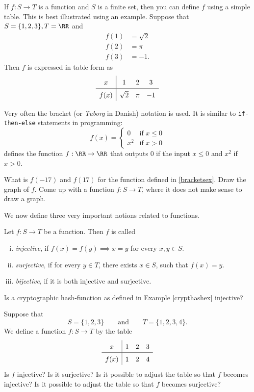 \documentclass{article}
\begin{document}
If $f: S\rightarrow T$ is a function and $S$ is a finite set, then you can
define $f$ using a simple table. This is best illustrated using an
example. Suppose that $S = \{1, 2, 3\}, T = \RR$ and
\begin{align*}
  f(1) &= \sqrt{2}\\
  f(2) &= \pi\\
  f(3) &= -1.
\end{align*}
Then $f$ is expressed in table form as
$$
\def\arraystretch{1.5}
\begin{array}{c|ccccccc}
x & 1 & 2 & 3\\ \hline
f(x) & \sqrt{2} & \pi & -1
\end{array}
$$

Very often the bracket (or \emph{Tuborg} in Danish) notation is used. It is
similar to \texttt{if-then-else} statements in programming:
\begin{equation}\label{bracketsex}
f(x) =
\begin{cases}
  0 &\text{if } x\leq 0\\
  x^2 &\text{if } x > 0
\end{cases}
\end{equation}
defines the function $f:\RR \rightarrow \RR$ that outputs $0$ if the
input $x\leq 0$ and $x^2$ if $x>0$.


\beginshex
What is $f(-17)$ and $f(17)$ for the function defined in \eqref{bracketsex}. Draw
the graph of $f$. Come up with a function $f:S\rightarrow T$, where it
does not make sense to draw a graph.
\endshex


We now define three very important notions related to functions.

\begin{definition}[emph]
  Let $f: S\rightarrow T$ be a function. Then $f$ is called
  \begin{enumerate}[(i)]
  \item
    \emph{injective}, if $f(x) = f(y) \implies x = y$ for every $x, y\in S$.
  \item
    \emph{surjective}, if for every $y\in T$, there exists $x\in S$, such that $f(x) = y$.
  \item
    \emph{bijective}, if it is both injective and surjective.
  \end{enumerate}
\end{definition}

\beginshex
Is a cryptographic hash-function as defined in Example \ref{crypthashex} injective?
\endshex

\beginshex
Suppose that
$$
S = \{1, 2, 3\}\qquad\text{and}\qquad T = \{1, 2, 3, 4\}.
$$
We define a function $f: S\rightarrow T$ by the table
$$
\def\arraystretch{1.5}
\begin{array}{c|ccccccc}
x & 1 & 2 & 3\\ \hline
f(x) & 1 & 2 & 4
\end{array}
$$
Is $f$ injective? Is it surjective? Is it possible to adjust the table so that
$f$ becomes injective?
Is it possible to adjust the table so that
$f$ becomes surjective?
\endshex
\end{document}
